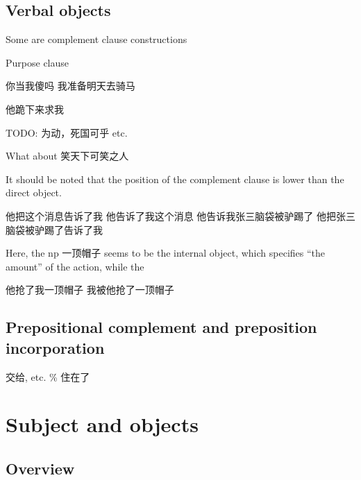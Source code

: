 \documentclass[UTF8, a4paper, oneside, scheme=plain, 12pt]{ctexrep}
\begin{document}
\subsection{Verbal objects}

Some are complement clause constructions

Purpose clause

\begin{exe}
    \ex 你当我傻吗
    \ex 我准备明天去骑马
\end{exe}

\begin{exe}
    \ex 他跪下来求我
\end{exe}

TODO: 为动，死国可乎 etc.

What about 笑天下可笑之人

It should be noted that the position of the complement clause
is lower than the direct object.

\begin{exe}
    \ex 他把这个消息告诉了我
    \ex 他告诉了我这个消息
    \ex 他告诉我张三脑袋被驴踢了
    \ex *他把张三脑袋被驴踢了告诉了我
\end{exe}

Here, the \acs{np} 一顶帽子 seems to be the internal object, 
which specifies ``the amount'' of the action,
while the 

\begin{exe}
    \ex 他抢了我一顶帽子
    \ex 我被他抢了一顶帽子
\end{exe}

\subsection{Prepositional complement and preposition incorporation}\label{sec:verb-phrase.internal.preposition}

交给, etc. \% 住在了

\section{Subject and objects}

\subsection{Overview}
\end{document}
